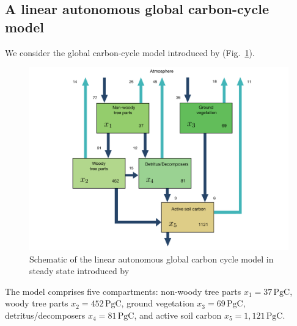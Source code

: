 \documentclass[smallextended]{svjour3}
\newcommand{\peta}{\mathrm{P}}
\newcommand{\gC}{\mathrm{gC}}
\newcommand{\yr}{\mathrm{yr}}
\providecommand{\DIFaddend}{} %
\providecommand{\DIFaddbeginFL}{} %
\providecommand{\DIFaddendFL}{} %
\providecommand{\DIFdelbeginFL}{} %
\providecommand{\DIFdelendFL}{} %
\newcommand{\DIFscaledelfig}{0.5}
\newlength{\DIFdelgraphicswidth} %
\newlength{\DIFdelgraphicsheight} %
\newcommand{\DIFaddincludegraphics}[2][]{{\color{blue}\fbox{\DIFOincludegraphics[#1]{#2}}}} %
\newcommand{\DIFdelincludegraphics}[2][]{%
\sbox{\DIFdelgraphicsbox}{\DIFOincludegraphics[#1]{#2}}%
\settoboxwidth{\DIFdelgraphicswidth}{\DIFdelgraphicsbox} %
\settoboxtotalheight{\DIFdelgraphicsheight}{\DIFdelgraphicsbox} %
\scalebox{\DIFscaledelfig}{%
\parbox[b]{\DIFdelgraphicswidth}{\usebox{\DIFdelgraphicsbox}\\[-\baselineskip] \rule{\DIFdelgraphicswidth}{0em}}\llap{\resizebox{\DIFdelgraphicswidth}{\DIFdelgraphicsheight}{%
\setlength{\unitlength}{\DIFdelgraphicswidth}%
\begin{picture}(1,1)%
\thicklines\linethickness{2pt} %
{\color[rgb]{1,0,0}\put(0,0){\framebox(1,1){}}}%
{\color[rgb]{1,0,0}\put(0,0){\line( 1,1){1}}}%
{\color[rgb]{1,0,0}\put(0,1){\line(1,-1){1}}}%
\end{picture}%
}\hspace*{3pt}}} %
} %
\DeclareRobustCommand{\DIFaddend}{\DIFOaddend \let\includegraphics\DIFOincludegraphics} %
\DeclareRobustCommand{\DIFaddbeginFL}{\DIFOaddbeginFL \let\includegraphics\DIFaddincludegraphics} %
\DeclareRobustCommand{\DIFaddendFL}{\DIFOaddendFL \let\includegraphics\DIFOincludegraphics} %
\DeclareRobustCommand{\DIFdelbeginFL}{\DIFOdelbeginFL \let\includegraphics\DIFdelincludegraphics} %
\DeclareRobustCommand{\DIFdelendFL}{\DIFOaddendFL \let\includegraphics\DIFOincludegraphics} %
\begin{document}
\DIFaddend \subsection{A linear autonomous global carbon-cycle model}
\label{sec:example_1}
We consider the global carbon-cycle model introduced by \citet{Emanuel1981} (Fig.~\ref{fig:Emanuel_model}).
\begin{figure}[htbp]
  \centering
  \DIFdelbeginFL %
\DIFdelendFL \DIFaddbeginFL \includegraphics[width=\linewidth]{figs/EmanuelModelStructure.pdf}
  \DIFaddendFL \caption{Schematic of the linear autonomous global carbon cycle model in steady state introduced by \citet{Emanuel1981}
  }
  \label{fig:Emanuel_model}
\end{figure}
The model comprises five compartments: non-woody tree parts $x_1=37\,\peta\gC$, woody tree parts $x_2=452\,\peta\gC$, ground vegetation $x_3=69\,\peta\gC$, detritus/decomposers $x_4=81\,\peta\gC$, and active soil carbon $x_5=1,121\,\peta\gC$.
\end{document}
